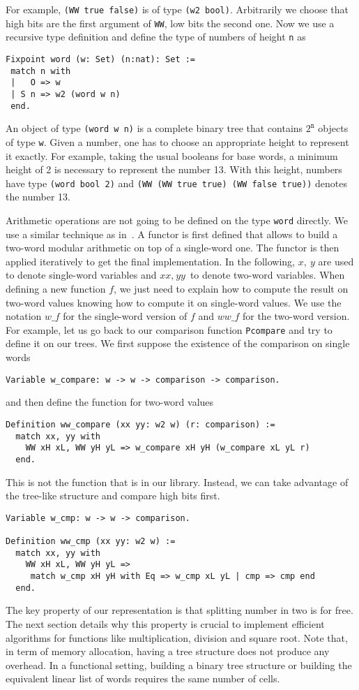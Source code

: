 For example, {\tt (WW true false)} is of type {\tt (w2 bool)}.
Arbitrarily we choose that high bits are the first argument of {\tt WW}, low bits
the second one. Now we use a recursive type definition and define
the type of numbers of height {\tt n} as
\begin{verbatim}
Fixpoint word (w: Set) (n:nat): Set :=
 match n with
 |   O => w
 | S n => w2 (word w n)
 end.
\end{verbatim}
An object of type {\tt (word w n)} is a complete binary tree that
contains $2^\texttt{n}$ objects of type {\tt w}. Given a number,
one has to choose an appropriate height to represent it exactly.
For example, taking the usual booleans for base words, a minimum
height of 2 is necessary to represent the number 13. With this height, 
numbers have type {\tt (word bool 2)} and 
{\tt (WW (WW true true) (WW false true))} denotes the number 13.

Arithmetic operations are not going to be defined on the type {\tt word} directly.
We use a similar technique as in~\cite{GreMa}. A functor is first defined that 
allows to build a two-word modular arithmetic on top of a single-word one.
The functor is then applied iteratively to get the final implementation.
In the following, $x,\ y$ are used to denote single-word variables and $\textit{xx},\ \textit{yy}$ 
to denote two-word variables. 
When defining a new function $f$, we just need to explain how to compute the 
result on two-word values knowing how to compute it on single-word values.
We use the notation $w\_f$ for the single-word version of $f$ and 
$\textit{ww}\_f$ for the two-word version.
For example, let us go back to our comparison function {\tt Pcompare}
and try to define it on our trees. We first suppose the existence
of the comparison on single words
\begin{verbatim}
Variable w_compare: w -> w -> comparison -> comparison.
\end{verbatim}
and then define the function for two-word values
\begin{verbatim}
Definition ww_compare (xx yy: w2 w) (r: comparison) :=
  match xx, yy with
    WW xH xL, WW yH yL => w_compare xH yH (w_compare xL yL r) 
  end.
\end{verbatim}
This is not the function that is in our library. Instead, we can take 
advantage of the tree-like structure and compare high bits first.  
\begin{verbatim}
Variable w_cmp: w -> w -> comparison.

Definition ww_cmp (xx yy: w2 w) :=
  match xx, yy with
    WW xH xL, WW yH yL => 
     match w_cmp xH yH with Eq => w_cmp xL yL | cmp => cmp end
  end. 
\end{verbatim}
The key property of our representation is that splitting number in two
is for free. The next section details why this property is crucial to implement efficient
algorithms for functions like multiplication, division and square root.
Note that, in term of memory allocation, having a tree structure
does not produce any overhead. In a functional setting, building a binary 
tree structure or building the equivalent linear list of words requires the same number of cells.

